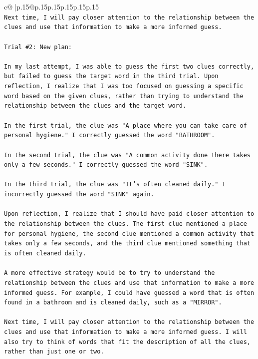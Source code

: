 \documentclass{article}
\begin{document}
{\begin{supertabular}{c@{$\;$}|p{.15\linewidth}@{}p{.15\linewidth}p{.15\linewidth}p{.15\linewidth}p{.15\linewidth}p{.15\linewidth}}
{{{\\ 
\texttt{Next time, I will pay closer attention to the relationship between the clues and use that information to make a more informed guess.} \\
\\ 
\texttt{Trial \#2: New plan: } \\
\\ 
\texttt{In my last attempt, I was able to guess the first two clues correctly, but failed to guess the target word in the third trial. Upon reflection, I realize that I was too focused on guessing a specific word based on the given clues, rather than trying to understand the relationship between the clues and the target word. } \\
\\ 
\texttt{In the first trial, the clue was "A place where you can take care of personal hygiene." I correctly guessed the word "BATHROOM". } \\
\\ 
\texttt{In the second trial, the clue was "A common activity done there takes only a few seconds." I correctly guessed the word "SINK". } \\
\\ 
\texttt{In the third trial, the clue was "It's often cleaned daily." I incorrectly guessed the word "SINK" again. } \\
\\ 
\texttt{Upon reflection, I realize that I should have paid closer attention to the relationship between the clues. The first clue mentioned a place for personal hygiene, the second clue mentioned a common activity that takes only a few seconds, and the third clue mentioned something that is often cleaned daily. } \\
\\ 
\texttt{A more effective strategy would be to try to understand the relationship between the clues and use that information to make a more informed guess. For example, I could have guessed a word that is often found in a bathroom and is cleaned daily, such as a "MIRROR". } \\
\\ 
\texttt{Next time, I will pay closer attention to the relationship between the clues and use that information to make a more informed guess. I will also try to think of words that fit the description of all the clues, rather than just one or two.} \\
\\ 
\\ 
}}}
\end{supertabular}}
\end{document}
